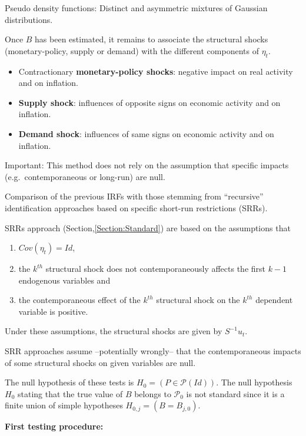 \documentclass[
]{book}
\providecommand{\tightlist}{%
  \setlength{\itemsep}{0pt}\setlength{\parskip}{0pt}}
\theoremstyle{definition}
\theoremstyle{definition}
\theoremstyle{definition}
\theoremstyle{definition}
\theoremstyle{remark}
\begin{document}
Pseudo density functions: Distinct and asymmetric mixtures of Gaussian distributions.

Once \(B\) has been estimated, it remains to associate the structural shocks (monetary-policy, supply or demand) with the different components of \(\eta_{t}\).

\begin{itemize}
\tightlist
\item
  Contractionary \textbf{monetary-policy shocks}: negative impact on real activity and on inflation.
\item
  \textbf{Supply shock}: influences of opposite signs on economic activity and on inflation.
\item
  \textbf{Demand shock}: influences of same signs on economic activity and on inflation.
\end{itemize}

Important: This method does not rely on the assumption that specific impacts (e.g.~contemporaneous or long-run) are null.

Comparison of the previous IRFs with those stemming from ``recursive'' identification approaches based on specific short-run restrictions (SRRs).

SRRs approach (Section,\ref{Section:Standard}) are based on the assumptions that

\begin{enumerate}
\def\labelenumi{\alph{enumi}.}
\tightlist
\item
  \(Cov(\eta_t)=Id\),
\item
  the \(k^{th}\) structural shock does not contemporaneously affects the first \(k-1\) endogenous variables and
\item
  the contemporaneous effect of the \(k^{th}\) structural shock on the \(k^{th}\) dependent variable is positive.
\end{enumerate}

Under these assumptions, the structural shocks are given by \(S^{-1}u_t\).

SRR approaches assume --potentially wrongly-- that the contemporaneous impacts of some structural shocks on given variables are null.

The null hypothesis of these tests is \(H_0= (P \in \mathcal{P}(Id))\).
The null hypothesis \(H_0\) stating that the true value of \(B\) belongs to \(\mathcal{P}_0\) is not standard since it is a finite union of simple hypotheses \(H_{0,j} = (B = B_{j,0})\).

\textbf{First testing procedure:}
\end{document}
